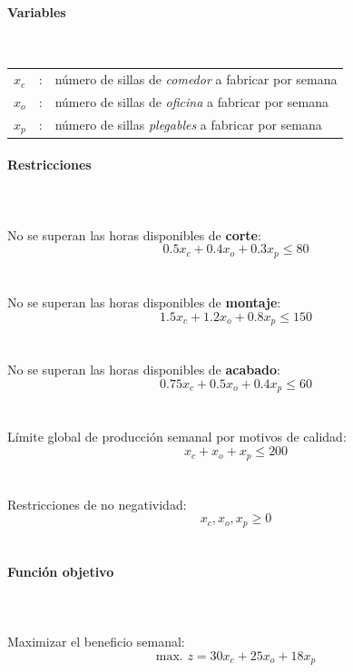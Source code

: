 \paragraph{Variables}\mbox{}\\

\begin{tabular}{l c l}
    $x_c$  & : & número de sillas de \textit{comedor} a fabricar por semana\\
    $x_o$  & : & número de sillas de \textit{oficina} a fabricar por semana\\
    $x_p$  & : & número de sillas \textit{plegables} a fabricar por semana\\
\end{tabular}

\paragraph{Restricciones}\mbox{}\\
\\
No se superan las horas disponibles de \textbf{corte}:
\begin{equation}
    0.5x_c + 0.4x_o + 0.3x_p \leq 80
\end{equation}
\\
\\
No se superan las horas disponibles de \textbf{montaje}:
\begin{equation}
    1.5x_c + 1.2x_o + 0.8x_p \leq 150
\end{equation}
\\
\\
No se superan las horas disponibles de \textbf{acabado}:
\begin{equation}
    0.75x_c + 0.5x_o + 0.4x_p \leq 60
\end{equation}
\\
\\
Límite global de producción semanal por motivos de calidad:
\begin{equation}
    x_c + x_o + x_p \leq 200
\end{equation}
\\
\\
Restricciones de no negatividad:
\begin{equation}
    x_c, x_o, x_p \geq 0
\end{equation}
\\

\paragraph{Función objetivo}\mbox{}\\
\\
Maximizar el beneficio semanal:
\begin{equation}
\mbox{max. } z = 30x_c + 25x_o + 18x_p
\end{equation}

